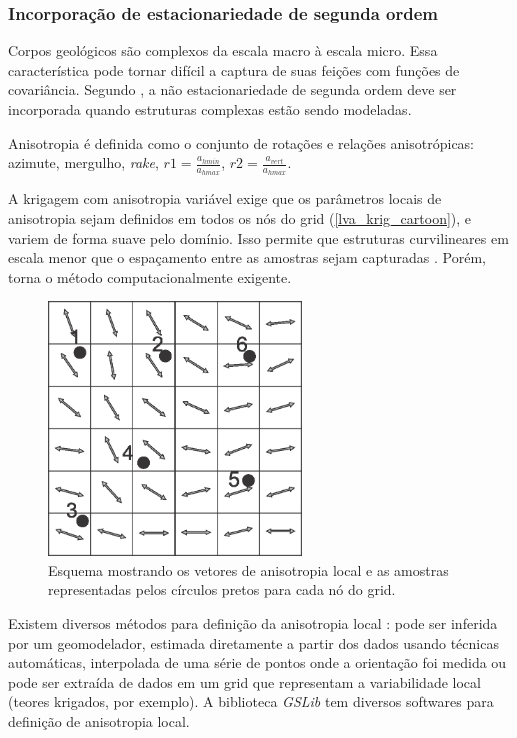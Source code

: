 \subsubsection{Incorporação de estacionariedade de segunda ordem}

Corpos geológicos são complexos da escala macro à escala micro. Essa característica pode tornar difícil a captura de suas feições com funções de covariância. Segundo , a não estacionariedade de segunda ordem deve ser incorporada quando estruturas complexas estão sendo modeladas.

Anisotropia é definida como o conjunto de rotações e relações anisotrópicas: azimute, mergulho, \textit{rake}, $r1 = \frac{a_{hmin}}{a_{hmax}}$, $r2 = \frac{a_{vert}}{a_{hmax}}$. 


A krigagem com anisotropia variável exige que os parâmetros locais de anisotropia sejam definidos em todos os nós do grid (\autoref{lva_krig_cartoon}), e variem de forma suave pelo domínio. Isso permite que estruturas curvilineares em escala menor que o espaçamento entre as amostras sejam capturadas \cite{martin2017implicitmodeling}. Porém, torna o método computacionalmente exigente.

\begin{figure}[H]
\caption{\label{lva_krig_cartoon}Esquema mostrando os vetores de anisotropia local e as amostras representadas pelos círculos pretos para cada nó do grid.}
	\centering
		\includegraphics[width=0.6\textwidth]{capitulo_2/imagens/lvakrig.jpg}
\end{figure}

Existem diversos métodos para definição da anisotropia local \cite{lillah2015inference}: pode ser inferida por um geomodelador, estimada diretamente a partir dos dados usando técnicas automáticas, interpolada de uma série de pontos onde a orientação foi medida ou pode ser extraída de dados em um grid que representam a variabilidade local (teores krigados, por exemplo). A biblioteca \textit{GSLib} tem diversos softwares para definição de anisotropia local. 

